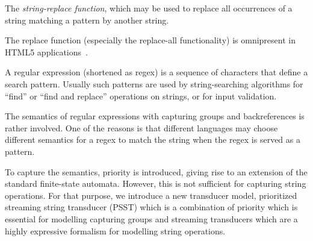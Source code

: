 {%
%
%

The \emph{string-replace function}, 
which may be used to replace all occurrences of a string matching a pattern by 
another string. 

The replace function (especially 
the replace-all functionality) is omnipresent in HTML5 applications~\cite{LB16,TCJ16,YABI14}. 

A regular expression (shortened as regex) is a sequence of characters that define a search pattern. Usually such patterns are used by string-searching algorithms for ``find'' or ``find and replace'' operations on strings, or for input validation.  

The semantics of regular expressions with capturing groups and backreferences is rather involved. One of the reasons is that different languages may choose different semantics for a regex to match the string when the regex is served as a pattern. 

To capture the semantics, priority is introduced, giving rise to an extension of the standard finite-state automata. However, this is not sufficient for capturing string operations. For that purpose, we introduce  a new transducer model, prioritized streaming string transducer (PSST) which is a combination of priority which is essential for modelling capturing groups and streaming transducers which are a highly expressive formalism for modelling string operations. 
}
